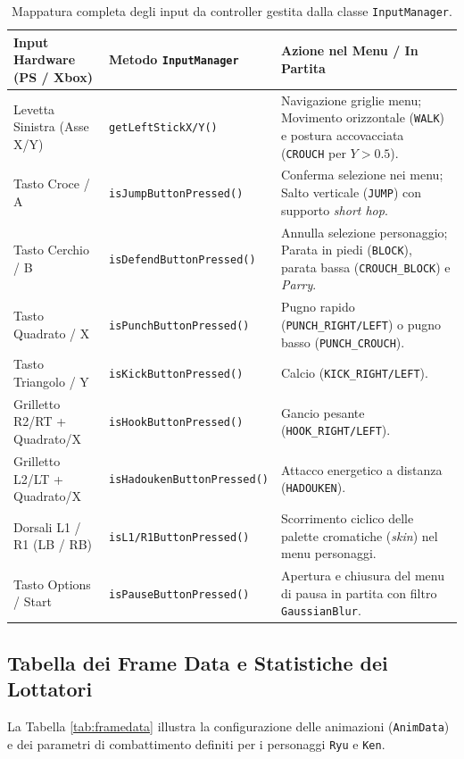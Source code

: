\documentclass[11pt, a4paper]{article}
\begin{document}
\begin{table}[htbp]
\centering
\begin{tabularx}{\textwidth}{l l X}
\toprule
\textbf{Input Hardware (PS / Xbox)} & \textbf{Metodo \texttt{InputManager}} & \textbf{Azione nel Menu / In Partita} \\
\midrule
Levetta Sinistra (Asse X/Y) & \texttt{getLeftStickX/Y()} & Navigazione griglie menu; Movimento orizzontale (\texttt{WALK}) e postura accovacciata (\texttt{CROUCH} per $Y > 0.5$). \\
Tasto Croce / A & \texttt{isJumpButtonPressed()} & Conferma selezione nei menu; Salto verticale (\texttt{JUMP}) con supporto \emph{short hop}. \\
Tasto Cerchio / B & \texttt{isDefendButtonPressed()} & Annulla selezione personaggio; Parata in piedi (\texttt{BLOCK}), parata bassa (\texttt{CROUCH\_BLOCK}) e \emph{Parry}. \\
Tasto Quadrato / X & \texttt{isPunchButtonPressed()} & Pugno rapido (\texttt{PUNCH\_RIGHT/LEFT}) o pugno basso (\texttt{PUNCH\_CROUCH}). \\
Tasto Triangolo / Y & \texttt{isKickButtonPressed()} & Calcio (\texttt{KICK\_RIGHT/LEFT}). \\
Grilletto R2/RT + Quadrato/X & \texttt{isHookButtonPressed()} & Gancio pesante (\texttt{HOOK\_RIGHT/LEFT}). \\
Grilletto L2/LT + Quadrato/X & \texttt{isHadoukenButtonPressed()} & Attacco energetico a distanza (\texttt{HADOUKEN}). \\
Dorsali L1 / R1 (LB / RB) & \texttt{isL1/R1ButtonPressed()} & Scorrimento ciclico delle palette cromatiche (\emph{skin}) nel menu personaggi. \\
Tasto Options / Start & \texttt{isPauseButtonPressed()} & Apertura e chiusura del menu di pausa in partita con filtro \texttt{GaussianBlur}. \\
\bottomrule
\end{tabularx}
\caption{Mappatura completa degli input da controller gestita dalla classe \texttt{InputManager}.}
\label{tab:controls}
\end{table}

\subsection{Tabella dei Frame Data e Statistiche dei Lottatori}
La Tabella \ref{tab:framedata} illustra la configurazione delle animazioni (\texttt{AnimData}) e dei parametri di combattimento definiti per i personaggi \texttt{Ryu} e \texttt{Ken}.
\end{document}
